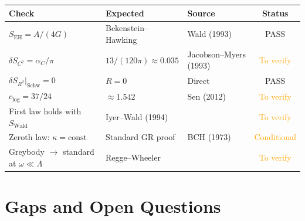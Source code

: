 \documentclass[12pt,a4paper]{article}
\theoremstyle{definition}
\theoremstyle{remark}
\begin{document}
\begin{center}
\begin{longtable}{lllc}
\toprule
\textbf{Check} & \textbf{Expected} & \textbf{Source} & \textbf{Status} \\
\midrule
\endhead
$S_{\mathrm{EH}} = A/(4G)$ & Bekenstein--Hawking & Wald (1993) &
  \textcolor{green!50!black}{PASS} \\
$\delta S_{C^2} = \alpha_C/\pi$ & $13/(120\pi) \approx 0.035$ &
  Jacobson--Myers (1993) & \textcolor{orange}{To verify} \\
$\delta S_{R^2}\big|_{\mathrm{Schw}} = 0$ & $R = 0$ &
  Direct & \textcolor{green!50!black}{PASS} \\
$c_{\log} = 37/24$ & $\approx 1.542$ & Sen (2012) &
  \textcolor{orange}{To verify} \\
First law holds with $S_{\mathrm{Wald}}$ & Iyer--Wald (1994) &
  & \textcolor{orange}{To verify} \\
Zeroth law: $\kappa = \mathrm{const}$ & Standard GR proof &
  BCH (1973) & \textcolor{orange}{Conditional} \\
Greybody $\to$ standard at $\omega \ll \Lambda$ & Regge--Wheeler &
  & \textcolor{orange}{To verify} \\
\bottomrule
\end{longtable}
\end{center}


\section{Gaps and Open Questions}
\label{sec:gaps}
\end{document}

